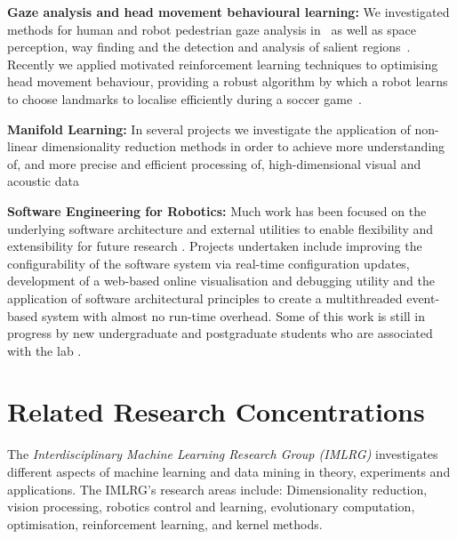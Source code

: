 \documentclass{llncs}
\begin{document}
\noindent\textbf{Gaze analysis and head movement behavioural learning:} We investigated methods for human and robot pedestrian gaze analysis in~\cite{JalalianEtAl_CAADRIA2011,WongEtAl2012} as well as space perception, way finding and the detection and analysis of salient regions~\cite{BhatiaEtAl2013,BhatiaChalupOstwald2013}. Recently we applied motivated reinforcement learning techniques to optimising head movement behaviour, providing a robust algorithm by which a robot learns to choose landmarks to localise efficiently during a soccer game~\cite{FountainEtAl2014}.

\noindent\textbf{Manifold Learning:} In several projects we
investigate the application of non-linear dimensionality reduction
methods in order to achieve more understanding of, and more precise
and efficient processing of, high-dimensional visual and acoustic data \cite{ChalupEtAl2007b,WongEtAl2012,WongChalup2008}

\noindent\textbf{Software Engineering for Robotics:} Much work has been focused on the underlying software architecture and external utilities to enable flexibility and extensibility for future research \cite{Kulk2011c,HoulistonEtAlNUClear2016}. Projects undertaken include improving the configurability of the software system via real-time configuration updates, development of a web-based online visualisation and debugging utility \cite{AnnableEtAl2014} and the application of software architectural principles to create a multithreaded event-based system with almost no run-time overhead. Some of this work is still in progress by new undergraduate and postgraduate students who are associated with the lab \cite{BilleEtAl2016}.

\section{Related Research Concentrations}
The \emph{Interdisciplinary Machine Learning Research Group (IMLRG)} investigates different aspects of machine learning and data mining in theory, experiments and applications. The IMLRG's research areas include: Dimensionality reduction, vision processing, robotics control and learning,  evolutionary computation, optimisation, reinforcement learning, and kernel methods. %



\end{document}
